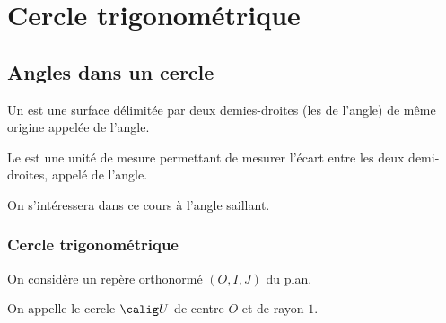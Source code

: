 \documentclass[10pt,openright,twoside,french]{book}
\begin{document}
\chapter{Cercle trigonométrique}\label{cercle_trigo}

\section{Angles dans un cercle}
\begin{Defi}
    Un  est une surface délimitée par deux demies-droites (les  de l'angle) de même origine appelée  de l'angle.\par
    Le  est une unité de mesure permettant de mesurer l'écart entre les deux demi-droites, appelé  de l'angle.
\end{Defi}

\begin{Rmq}
    On s'intéressera dans ce cours à l'angle saillant.
    \begin{center}
    \end{center}
\end{Rmq}

\subsection{Cercle trigonométrique}

\begin{Defi}
    On considère un repère orthonormé $(O,I,J)$ du plan.\par
    On appelle  le cercle $\calig U$ de centre $O$ et de rayon $1$.
\end{Defi}
\end{document}
